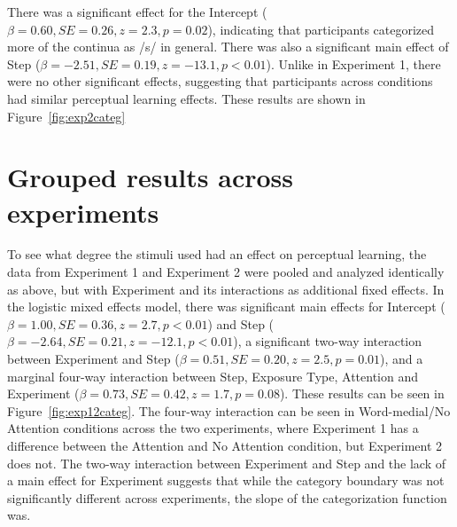 There was a significant effect for the Intercept ($\beta = 0.60, SE = 0.26, z = 2.3, p = 0.02$), indicating that participants categorized more of the continua as /s/ in general. 
 There was also a significant main effect of Step ($\beta = -2.51, SE = 0.19, z = -13.1, p < 0.01$).  
Unlike in Experiment 1, there were no other significant effects, suggesting that participants across conditions had similar perceptual learning effects.
These results are shown in Figure~\ref{fig:exp2categ}

\section{Grouped results across experiments}

To see what degree the stimuli used had an effect on perceptual learning, the data from Experiment 1 and Experiment 2 were pooled and analyzed identically as above, but with Experiment and its interactions as additional fixed effects.  
In the logistic mixed effects model, there was significant main effects for Intercept ($\beta = 1.00, SE = 0.36, z = 2.7, p < 0.01$) and Step ($\beta = -2.64, SE = 0.21, z = -12.1, p < 0.01$), a significant two-way interaction between Experiment and Step ($\beta = 0.51, SE = 0.20, z = 2.5, p = 0.01$), and a marginal four-way interaction between Step, Exposure Type, Attention and Experiment ($\beta = 0.73, SE = 0.42, z = 1.7, p = 0.08$).  
These results can be seen in Figure~\ref{fig:exp12categ}.  
The four-way interaction can be seen in Word-medial/No Attention conditions across the two experiments, where Experiment 1 has a difference between the Attention and No Attention condition, but Experiment 2 does not.  
The two-way interaction between Experiment and Step and the lack of a main effect for Experiment suggests that while the category boundary was not significantly different across experiments, the slope of the categorization function was.

